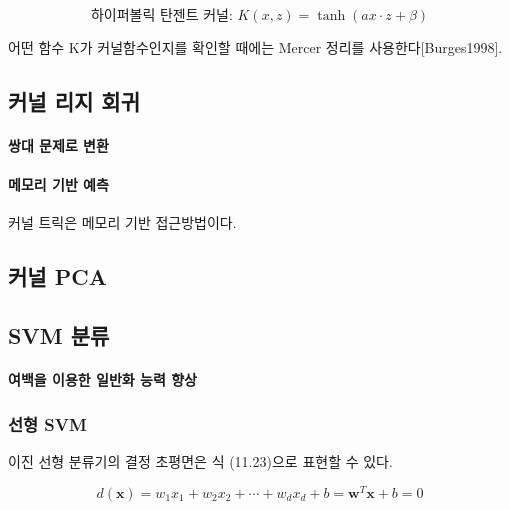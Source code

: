 \documentclass [12pt] {oblivoir}
\let\oldsubsubsection=\subsubsection
\renewcommand{\subsubsection}
{
  \filbreak
  \oldsubsubsection
}
\begin{document}
\begin{equation} \tag{11.8}
  \text{하이퍼볼릭 탄젠트 커널: } K(x, z) = \tanh(ax \cdot z + \beta)
\end{equation}

어떤 함수 K가 커널함수인지를 확인할 때에는 Mercer 정리를 사용한다[Burges1998].

\vspace{3mm}

\subsection{커널 리지 회귀}

\paragraph*{쌍대 문제로 변환}\mbox{}

\vspace{3mm}

\paragraph*{메모리 기반 예측}\mbox{}

커널 트릭은 메모리 기반 접근방법이다.

\vspace{3mm}

\subsection{커널 PCA}

\subsection{SVM 분류}

\paragraph*{여백을 이용한 일반화 능력 향상}\mbox{}

\vspace{3mm}

\subsubsection{선형 SVM}

이진 선형 분류기의 결정 초평면은 식 (11.23)으로 표현할 수 있다.

\begin{equation} \tag{11.23}
  d(\mathbf{x}) =  w_{1}x_{1} + w_{2}x_{2} + \cdots + w_{d}x_{d} + b = \mathbf{w}^{T}\mathbf{x} + b = 0
\end{equation}
\end{document}
